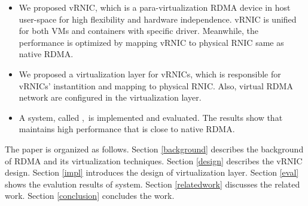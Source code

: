 \begin{itemize}
	\item We proposed vRNIC, which is a para-virtualization RDMA device in host user-space for high flexibility and hardware independence. vRNIC is unified for both VMs and containers with specific driver. Meanwhile, the performance is optimized by mapping vRNIC to physical RNIC same as native RDMA.
	
	\item We proposed a virtualization layer for vRNICs, which is responsible for vRNICs' instantition and mapping to physical RNIC. Also, virtual RDMA network are configured in the virtualization layer.
	
	\item A system, called \sys,~is implemented and evaluated. The results show that \sys maintains high performance that is close to native RDMA.
\end{itemize}

The paper is organized as follows. Section \ref{background} describes the background of RDMA and its virtualization techniques. Section \ref{design} describes the vRNIC design. Section \ref{impl} introduces the design of virtualization layer. Section \ref{eval} shows the evalution results of \sys system. Section \ref{relatedwork} discusses the related work. Section \ref{conclusion} concludes the work.